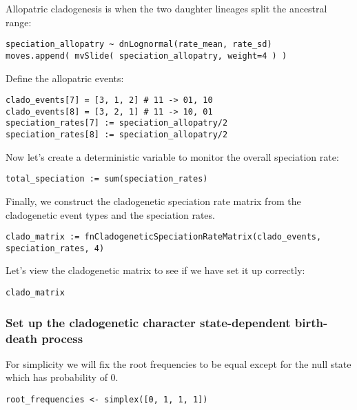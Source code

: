 Allopatric cladogenesis is when the two daughter lineages
split the ancestral range:
{\tt \begin{snugshade*}
\begin{lstlisting}
speciation_allopatry ~ dnLognormal(rate_mean, rate_sd)
moves.append( mvSlide( speciation_allopatry, weight=4 ) )
\end{lstlisting}
\end{snugshade*}}

Define the allopatric events:
{\tt \begin{snugshade*}
\begin{lstlisting}
clado_events[7] = [3, 1, 2] # 11 -> 01, 10
clado_events[8] = [3, 2, 1] # 11 -> 10, 01
speciation_rates[7] := speciation_allopatry/2
speciation_rates[8] := speciation_allopatry/2
\end{lstlisting}
\end{snugshade*}}

Now let's create a deterministic variable to monitor the overall speciation rate:
{\tt \begin{snugshade*}
\begin{lstlisting}
total_speciation := sum(speciation_rates)
\end{lstlisting}
\end{snugshade*}}

Finally, we construct the cladogenetic speciation rate
matrix from the cladogenetic event types and the speciation rates.
{\tt \begin{snugshade*}
\begin{lstlisting}
clado_matrix := fnCladogeneticSpeciationRateMatrix(clado_events, speciation_rates, 4)
\end{lstlisting}
\end{snugshade*}}

Let's view the cladogenetic matrix to see if we have set it up correctly:
{\tt \begin{snugshade*}
\begin{lstlisting}
clado_matrix
\end{lstlisting}
\end{snugshade*}}

\subsubsection{Set up the cladogenetic character state-dependent birth-death process}

For simplicity we will fix the root frequencies to be equal except for the null state
which has probability of 0.
{\tt \begin{snugshade*}
\begin{lstlisting}
root_frequencies <- simplex([0, 1, 1, 1])
\end{lstlisting}
\end{snugshade*}}

